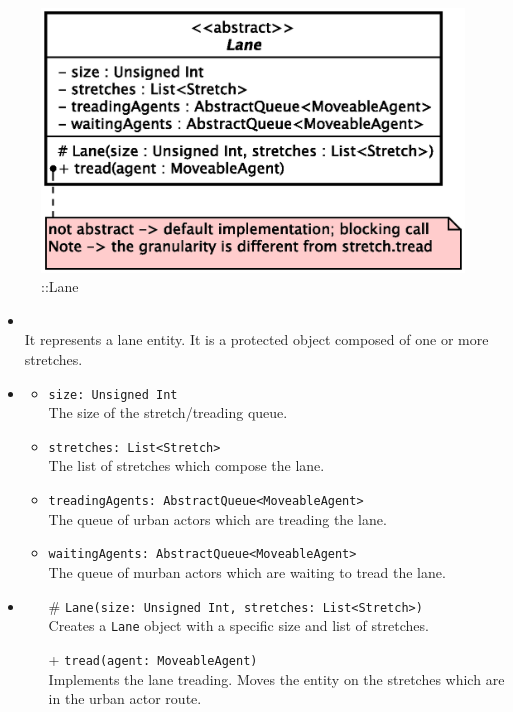 \begin{figure}[h]
\centering
\includegraphics[scale=0.6,keepaspectratio]{images/solution/app/backend/lane.eps}
\caption{\pReactiveComponentLane::Lane}
\label{fig:sd-app-lane}
\end{figure}
\FloatBarrier
\begin{itemize}
  \item \textbf{\descr} \\
    It represents a lane entity. It is a protected object composed of one or
    more stretches.
  \item \textbf{\attrs}
  \begin{itemize}
    \item \texttt{size: Unsigned Int} \\
The size of the stretch/treading queue.
    \item \texttt{stretches: List<Stretch>} \\
The list of stretches which compose the lane.
    \item \texttt{treadingAgents: AbstractQueue<MoveableAgent>} \\
The queue of urban actors which are treading the lane.
    \item \texttt{waitingAgents: AbstractQueue<MoveableAgent>} \\
The queue of murban actors which are waiting to tread the lane. 
  \end{itemize}
  \item \textbf{\ops}
  \begin{itemize} 
    \item[\#] \texttt{Lane(size: Unsigned Int, stretches: List<Stretch>)} \\
Creates a \texttt{Lane} object with a specific size and list of stretches.
    \item[+] \texttt{tread(agent: MoveableAgent)} \\
Implements the lane treading. Moves the entity on the stretches which are 
in the urban actor route.
  \end{itemize}
\end{itemize}
